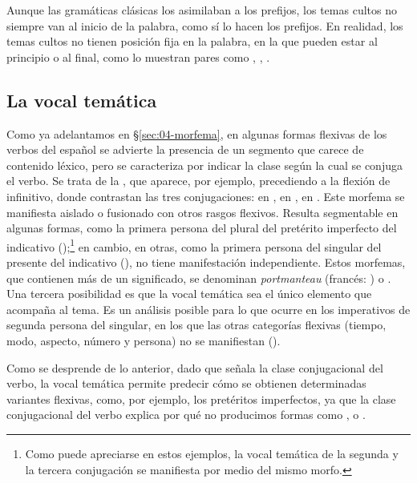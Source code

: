 \begin{recuadro}
Aunque las gramáticas clásicas los asimilaban a los prefijos, los temas cultos
no siempre van al inicio de la palabra, como sí lo hacen los prefijos. En
realidad, los temas cultos no tienen posición fija en la palabra, en la que
pueden estar al principio o al final, como lo muestran pares como
, ,
.
\end{recuadro}

\subsection{La vocal temática}\label{sec:04-vt}

Como ya adelantamos en §\ref{sec:04-morfema}, en algunas formas flexivas de los
verbos del español se advierte la presencia de un segmento que carece de
contenido léxico, pero se caracteriza por indicar la clase según la cual se
conjuga el verbo. Se trata de la , que aparece, por
ejemplo, precediendo a la flexión de infinitivo, donde contrastan las tres
conjugaciones:  en ,  en ,
 en . Este morfema se manifiesta aislado o fusionado con
otros rasgos flexivos. Resulta segmentable en algunas formas, como la primera
persona del plural del pretérito imperfecto del indicativo
();\footnote{Como puede apreciarse
en estos ejemplos, la vocal temática de la segunda y la tercera conjugación se
manifiesta por medio del mismo morfo.} en cambio, en otras, como la primera
persona del singular del presente del indicativo (),
no tiene manifestación independiente. Estos morfemas, que contienen más de un
significado, se denominan \textit{portmanteau} (francés: ) o
. Una tercera posibilidad es que la vocal temática sea el
único elemento que acompaña al tema. Es un análisis posible para lo que ocurre
en los imperativos de segunda persona del singular, en los que las otras
categorías flexivas (tiempo, modo, aspecto, número y persona) no se manifiestan
().

Como se desprende de lo anterior, dado que señala la clase conjugacional del
verbo, la vocal temática permite predecir cómo se obtienen determinadas
variantes flexivas, como, por ejemplo, los pretéritos imperfectos, ya que la
clase conjugacional del verbo explica por qué no producimos formas como
,  o
.


